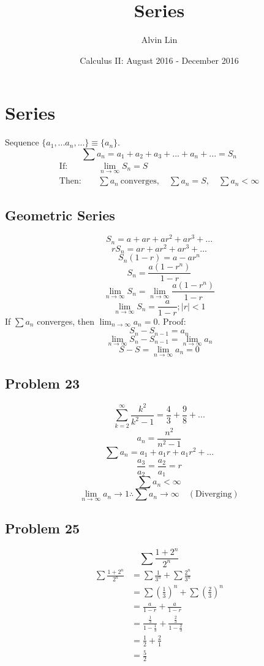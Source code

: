 \documentclass[letterpaper, 12pt]{math}
\title{Series}
\author{Alvin Lin}
\date{Calculus II: August 2016 - December 2016}
\begin{document}
\maketitle

\section*{Series}
Sequence \( \bigg\{a_{1},...a_{n},...\bigg\} \equiv \bigg\{a_{n}\bigg\} \).
\[ \sum{a_{n}} = a_{1}+a_{2}+a_{3}+...+a_{n}+... = S_{n} \]
\begin{align*}
  \mathrm{If:} & \quad \lim_{n\to\infty}{S_{n}} = S \\
  \mathrm{Then:} & \quad \sum{a_{n}} \mathrm{\ converges},
    \quad \sum{a_{n}} = S, \quad \sum{a_{n}}<\infty
\end{align*}

\subsection*{Geometric Series}
\[ S_{n} = a+ar+ar^{2}+ar^{3}+... \]
\[ rS_{n} = ar+ar^{2}+ar^{3}+... \]
\[ S_{n}(1-r) = a-ar^{n} \]
\[ S_{n} = \frac{a(1-r^{n})}{1-r} \]
\[ \lim_{n\to\infty}{S_{n}} = \lim_{n\to\infty}{\frac{a(1-r^{n})}{1-r}} \]
\[ \lim_{n\to\infty}{S_{n}} = \frac{a}{1-r}; |r| < 1 \]
If \( \sum{a_{n}} \) converges, then \( \lim_{n\to\infty}{a_{n}} = 0 \). Proof:
\[ S_{n}-S_{n-1} = a_{n} \]
\[ \lim_{n\to\infty}{S_{n}-S_{n-1}} = \lim_{n\to\infty}{a_{n}} \]
\[ S-S = \lim_{n\to\infty}{a_{n}} = 0 \]

\subsection*{Problem 23}
\[ \sum_{k=2}^{\infty}\frac{k^{2}}{k^{2}-1} = \frac{4}{3}+\frac{9}{8}+...\]
\[ a_{n} = \frac{n^{2}}{n^{2}-1} \]
\[ \sum{a_{n}} = a_{1}+a_{1}r+a_{1}r^{2}+... \]
\[ \frac{a_{3}}{a_{2}} = \frac{a_{2}}{a_{1}} = r \]
\[ \sum{a_{n}} < \infty \]
\[ \lim_{n\to\infty}a_{n}\to1 \therefore \sum{a_{n}}\to\infty \quad
   \mathrm{(Diverging)} \]

\subsection*{Problem 25}
\[ \sum\frac{1+2^{n}}{2^{n}} \]
\begin{align*}
  \sum\frac{1+2^{n}}{2^{n}} &= \sum\frac{1}{3^{n}}+\sum\frac{2^{n}}{3^{n}} \\
  &= \sum(\frac{1}{3})^{n}+\sum(\frac{2}{3})^{n} \\
  &= \frac{a}{1-r}+\frac{a}{1-r} \\
  &= \frac{\frac{1}{3}}{1-\frac{1}{3}}+\frac{\frac{2}{3}}{1-\frac{2}{3}} \\
  &= \frac{1}{2}+\frac{2}{1} \\
  &= \frac{5}{2}
\end{align*}
\end{document}
